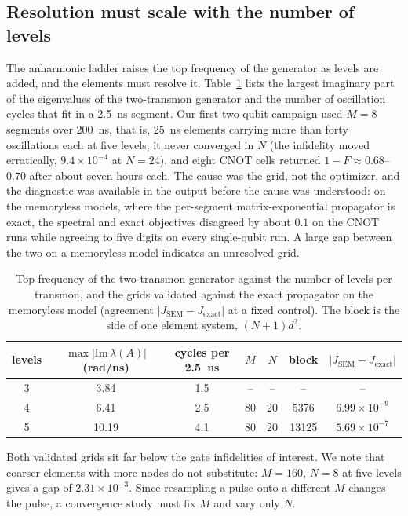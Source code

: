 \documentclass[10pt]{article}
\begin{document}
\subsection{Resolution must scale with the number of levels}

The anharmonic ladder raises the top frequency of the generator as levels are
added, and the elements must resolve it. Table~\ref{tab:freq} lists the largest
imaginary part of the eigenvalues of the two-transmon generator and the number
of oscillation cycles that fit in a 2.5~ns segment. Our first two-qubit
campaign used $M = 8$ segments over 200~ns, that is, 25~ns elements carrying
more than forty oscillations each at five levels; it never converged in $N$
(the infidelity moved erratically, $9.4\times10^{-4}$ at $N = 24$), and eight
CNOT cells returned $1 - F \approx 0.68$--$0.70$ after about seven hours each.
The cause was the grid, not the optimizer, and the diagnostic was available in
the output before the cause was understood: on the memoryless models, where the
per-segment matrix-exponential propagator is exact, the spectral and exact
objectives disagreed by about $0.1$ on the CNOT runs while agreeing to five
digits on every single-qubit run. A large gap between the two on a memoryless
model indicates an unresolved grid.

\begin{table}[htbp]
\centering
\caption{Top frequency of the two-transmon generator against the number of
levels per transmon, and the grids validated against the exact propagator on
the memoryless model (agreement $|J_{\mathrm{SEM}} - J_{\mathrm{exact}}|$ at a
fixed control). The block is the side of one element system, $(N{+}1)d^2$.}
\label{tab:freq}
\small
\begin{tabular}{ccc@{\qquad}cccc}
\toprule
levels & $\max|\mathrm{Im}\,\lambda(A)|$ (rad/ns) & cycles per 2.5~ns
  & $M$ & $N$ & block & $|J_{\mathrm{SEM}} - J_{\mathrm{exact}}|$ \\
\midrule
3 & 3.84  & 1.5 & -- & -- & -- & -- \\
4 & 6.41  & 2.5 & 80 & 20 & 5376  & $6.99\times10^{-9}$ \\
5 & 10.19 & 4.1 & 80 & 20 & 13125 & $5.69\times10^{-7}$ \\
\bottomrule
\end{tabular}
\end{table}

Both validated grids sit far below the gate infidelities of interest. We note
that coarser elements with more nodes do not substitute: $M = 160$, $N = 8$ at
five levels gives a gap of $2.31\times10^{-3}$. Since resampling a pulse onto a
different $M$ changes the pulse, a convergence study must fix $M$ and vary only
$N$.
\end{document}
